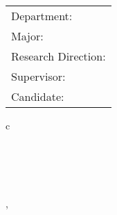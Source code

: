 \vskip 2cm {\large
\begin{center}
\begin{tabular}{l}
Department:\\
Major:\\
Research Direction:\\
Supervisor:\\
Candidate:
\end{tabular}
\begin{tabular}c
\small \schoolNameEng \\
\hline \emajor  \\
\hline \efield\\
\hline \eadvisor\\
\hline \ename\\
\hline
\end{tabular}
\end{center}}

\vskip 30mm

\begin{center}
{\Large \monthOfGraduationEng, \yearOfGrduation}
\end{center}
